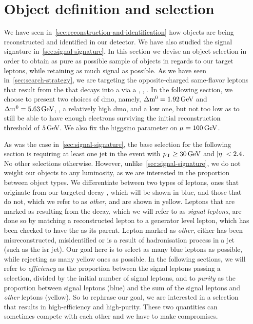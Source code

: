 \clearpage
\section{Object definition and selection}
We have seen in~\ref{sec:reconstruction-and-identification} how objects are being reconstructed and identified in our detector. We have also studied the signal signature in~\ref{sec:signal-signature}. In this section we devise an object selection in order to obtain as pure as possible sample of objects in regards to our target leptons, while retaining as much signal as possible. As we have seen in~\ref{sec:search-strategy}, we are targeting the opposite-charged same-flavor leptons \ellell that result from the \neutt that decays into a \neuto via a \PZstar, \ie, \neuttdecay. In the following section, we choose to present two choices of \gls{dmo}, namely, $\Delta\mathrm{m}^0=1.92\,\text{Ge\hspace{-.08em}V}$ and $\Delta\mathrm{m}^0=5.63\,\text{Ge\hspace{-.08em}V}$, \ie, a relatively high \gls{dmo}, and a low one, but not too low as to still be able to have enough electrons surviving the initial reconstruction \pt threshold of $5\,\text{Ge\hspace{-.08em}V}$. We also fix the higgsino parameter on $\mu=100\,\text{Ge\hspace{-.08em}V}$.

As was the case in~\ref{sec:signal-signature}, the base selection for the following section is requiring at least one jet in the event with $p_{\mathrm{T}} \geq 30\,\text{Ge\hspace{-.08em}V}$ and $\lvert \eta \rvert<2.4$. No other selections otherwise. However, unlike~\ref{sec:signal-signature}, we do not weight our objects to any luminosity, as we are interested in the proportion between object types. We differentiate between two types of leptons, ones that originate from our targeted decay \neuttdecay, which will be shown in blue, and those that do not, which we refer to as \emph{other}, and are shown in yellow. Leptons that are marked as resulting from the \neuttdecay decay, which we will refer to as \emph{signal leptons}, are done so by matching a reconstructed lepton to a generator level lepton, which has been checked to have the \neutt as its parent. Lepton marked as \emph{other}, either has been misreconstructed, misidentified or is a result of hadronisation process in a jet (such as the \gls{isr} jet). Our goal here is to select as many blue leptons as possible, while rejecting as many yellow ones as possible. In the following sections, we will refer to \emph{efficiency} as the proportion between the signal leptons passing a selection, divided by the initial number of signal leptons, and to \emph{purity} as the proportion between signal leptons (blue) and the sum of the signal leptons and \emph{other} leptons (yellow). So to rephrase our goal, we are interested in a selection that results in high-efficiency and high-purity. These two quantities can sometimes compete with each other and we have to make compromises.

